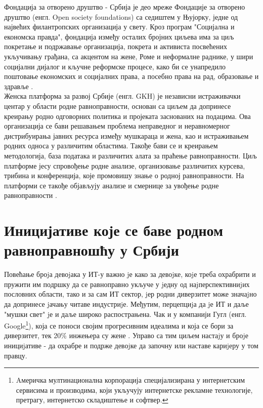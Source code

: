 \documentclass[a4paper]{article}
\begin{document}
Фондација за отворено друштво - Србија је део мреже Фондације за отворено друштво (енгл. Open society foundations) са седиштем у Њујорку, једне од највећих филантропских организација у свету. Кроз програм "Социјална и економска правда", фондација између осталих бројних циљева има за циљ покретање и подржавање организација, покрета и активиста посвећених укључивању грађана, са акцентом на жене, Роме и  неформалне раднике,  у шири социјални дијалог и кључне реформске процесе, како би се унапредило поштовање економских и социјалних права, а посебно права на рад, образовање и здравље \cite{fondacijaVrata}. \\
    
Женска платформа за развој Србије (енгл. GKH) је независни истраживачки центар у области родне равноправности, основан са циљем да допринесе креирању родно одговорних политика и пројеката заснованих на подацима. Ова организација се бави решавањем проблема неправедног и неравномерног дистрибуирања јавних ресурса између мушкараца и жена, као и истраживањем родних односа у различитим областима. Такође бави се и креирањем методологија, база података и различитих алата за праћење равноправности. Циљ платформе јесу спровођење родне анализе, организовање различитих курсева, трибина и конференција, које промовишу знање о родној равноправности. На платформи се такође објављују анализе и смернице за увођење родне равноправности \cite{fondacijaZene}. 

\section{Иницијативе које се баве родном равноправношћу у Србији}
\label{sec:naslov3}

Повећање броjа девоjака у ИТ-у важно jе како за девоjке, коjе
треба охрабрити и пружити им подршку да се равноправно укључе у
jедну од наjперспективниjих пословних области, тако и за сам ИТ сектор, 
jер родни диверзитет може значаjно да допринесе jачању читаве индустриjе. 
Међутим, перцепциjа да jе ИТ и даље "мушки свет" jе и
даље широко распострањена. Чак и у компанији Гугл (енгл. Google\footnote{Aмеричка мултинационална 
корпорација специјализирана у интернетским сервисима и производима, који укључују интернетске 
рекламне технологије, претрагу, интернетско складиштење и софтвер.}), која се поноси својим 
прогресивним идеалима и која се бори за диверзитет, тек 20\% инжењера су жене \cite{gugl}. 
Управо са тим циљем настаjу и броjе инициjативе - да охрабре и подрже девоjке 
да започну или наставе кариjеру у том правцу.
\end{document}
